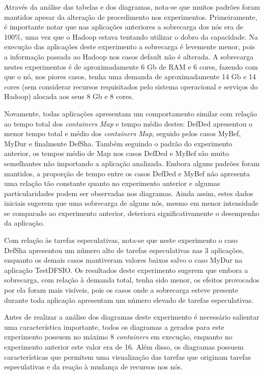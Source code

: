 Através da análise das tabelas e dos diagramas, nota-se que muitos padrões foram mantidos apesar da alteração de procedimento nos experimentos. Primeiramente, é importante notar que nas aplicações anteriores a sobrecarga dos nós era de 100\%, uma vez que o Hadoop estava tentando utilizar o dobro da capacidade. Na execução das aplicações deste experimento a sobrecarga é levemente menor, pois a informação passada ao Hadoop nos casos default não é alterada. A sobrecarga nestes experimentos é de aproximadamente 6 Gb de RAM e 6 cores, fazendo com que o nó, nos piores casos, tenha uma demanda de aproximadamente 14 Gb e 14 cores (sem considerar recursos requisitados pelo sistema operacional e serviços do Hadoop) alocada aos seus 8 Gb e 8 cores.

Novamente, todas aplicações apresentam um comportamento similar com relação ao tempo total dos \textit{containers Map} e tempo médio destes: DefDed apresentou o menor tempo total e médio dos \textit{containers Map}, seguido pelos casos MyBef, MyDur e finalmente DefSha. Também seguindo o padrão do experimento anterior, os tempos médio de Map nos casos DefDed e MyBef são muito semelhantes não importando a aplicação analizada. Embora alguns padrões foram mantidos, a proporção de tempo entre os casos DefDed e MyBef não apresenta uma relação tão constante quanto no experimento anterior e algumas particularidades podem ser observadas nos diagramas. Ainda assim, estes dados iniciais sugerem que uma sobrecarga de alguns nós, mesmo em menor intensidade se comparado ao experimento anterior, deteriora significativamente o desempenho da aplicação.

Com relação às tarefas especulativas, nota-se que neste experimento o caso DefSha apresentou um número alto de tarefas especulativas nas 3 aplicações, enquanto os demais casos mantiveram valores baixos salvo o caso MyDur na aplicação TestDFSIO. Os resultados deste experimento sugerem que embora a sobrecarga, com relação à demanda total, tenha sido menor, os efeitos provocados por ela foram mais visíveis, pois os casos onde a sobrecarga esteve presente durante toda aplicação apresentam um número elevado de tarefas especulativas.

Antes de realizar a análise dos diagramas deste experimento é necessário salientar uma característica importante, todos os diagramas a gerados para este experimento possuem no máximo 8 \textit{containers} em execução, enquanto no experimento anterior este valor era de 16. Além disso, os diagramas possuem características que permitem uma visualização das tarefas que originam tarefas especulativas e da reação à mudança de recursos nos nós. 

